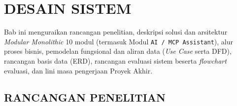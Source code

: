 \chapter{DESAIN SISTEM}

Bab ini menguraikan rancangan penelitian, deskripsi solusi dan arsitektur \textit{Modular Monolithic} 10 modul (termasuk Modul \texttt{AI / MCP Assistant}), alur proses bisnis, pemodelan fungsional dan aliran data (\textit{Use Case} serta DFD), rancangan basis data (ERD), rancangan evaluasi sistem beserta \textit{flowchart} evaluasi, dan lini masa pengerjaan Proyek Akhir.

\section{RANCANGAN PENELITIAN}
\label{sec:rancangan_penelitian}

